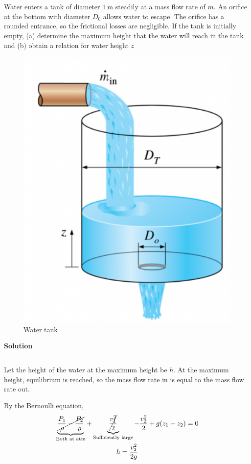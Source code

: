 \section{}

Water enters a tank of diameter $\SI{1}{\meter}$ steadily at a mass flow rate of $\dot{m}$.
An orifice at the bottom with diameter $D_0$ allows water to escape. The orifice has a rounded
entrance, so the frictional losses are negligible. If the tank is initially empty, (a) determine the
maximum height that the water will reach in the tank and (b) obtain a relation for water height $z$

\begin{figure}[h]
    \centering
    \includegraphics[width=0.4\linewidth]{Questions/Figures/Q3ProblemDiagram.png}
    \caption{Water tank}
    \label{fig:Q3ProblemDiagram}
\end{figure}

\textbf{Solution} \\
\subsection{}
Let the height of the water at the maximum height be $h$. At the maximum height, equilibrium is reached, so the mass flow rate in is equal to the mass flow rate out.

By the Bernoulli equation,
\begin{gather*}
    \underbrace{\cancel{\frac{P_1}{\rho} - \frac{P_2}{\rho}}}_{\text{Both at atm}} + \underbrace{\cancel{\frac{v_1^2}{2}}}_{\text{Sufficiently large}} - \frac{v_2^2}{2} + g(z_1 - z_2) = 0 \\
    h = \frac{v_2^2}{2g}
\end{gather*}

